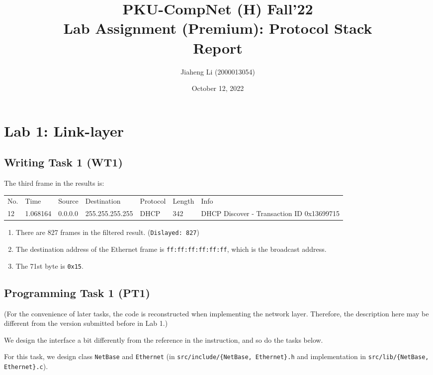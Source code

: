 \documentclass[a4paper]{article}
\title{PKU-CompNet (H) Fall'22 \\ Lab Assignment (Premium): Protocol Stack \\ Report}
\author{Jiaheng Li (2000013054)}
\date{October 12, 2022}
\begin{document}
  \maketitle

  \section{Lab 1: Link-layer}

  \subsection{Writing Task 1 (WT1)}

  The third frame in the results is:
  \begin{table}[!ht]
    \centering
    \fontsize{8pt}{8pt}
    \ttfamily
    \begin{tabular}{lllllll}
      No. & Time & Source & Destination & Protocol & Length & Info \\
      12 & 1.068164 & 0.0.0.0 & 255.255.255.255 & DHCP & 342 & DHCP Discover - Transaction ID 0x13699715
    \end{tabular}
  \end{table}

  \begin{enumerate}
    \item There are 827 frames in the filtered result. (\texttt{Dislayed: 827})
    \item The destination address of the Ethernet frame is \texttt{ff:ff:ff:ff:ff:ff}, which is the broadcast address.
    \item The 71st byte is \texttt{0x15}.
  \end{enumerate}

  \subsection{Programming Task 1 (PT1)}

  (For the convenience of later tasks, the code is reconstructed when implementing the network layer. Therefore, the description here may be different from the version submitted before in Lab 1.)

  We design the interface a bit differently from the reference in the instruction, and so do the tasks below.

  For this task, we design class \texttt{NetBase} and \texttt{Ethernet} (in \texttt{src/include/\{NetBase, Ethernet\}.h} and implementation in \texttt{src/lib/\{NetBase, Ethernet\}.c}).
\end{document}
